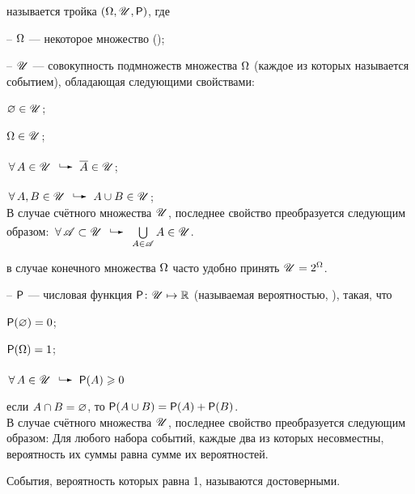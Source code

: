 \documentclass[a4paper,12pt]{article}
\begin{document}
   называется тройка $(\Omega, \mathscr{U}, \mathsf{P})$, где
  \begin{items}{-3}
  \item[--] $\Omega$ --- некоторое множество ();
  \item[--] $\mathscr{U}$ --- совокупность подмножеств множества $\Omega$ (каждое из которых называется  событием), обладающая следующими свойствами:
      \begin{items}{-4}
        \item[\textbullet] $\varnothing\in\mathscr{U}$;
        \item[\textbullet] $\Omega\in\mathscr{U}$;
        \item[\textbullet] $\fa A\in\Us\exec\overline{A}\in\Us$;
        \item[\textbullet] $\fa A,B\in\Us\exec A\cup B\in\Us$;\\%
        В случае счётного множества $\mathscr{U}$, последнее свойство преобразуется следующим образом: $\fa\As\subset\Us\exec\bigcup\limits_{A\in\As}A\in\Us$.
      \end{items}
      \vspace{-0.35cm}
      в случае конечного множества $\Omega$ часто удобно принять $\mathscr{U}=2^\Omega$.
  \item[--] $\mathsf{P}$ --- числовая функция $\mathsf{P}\colon\mathscr{U}\mapsto\mathbb{R}$ (называемая  вероятностью, ), такая, что
      \begin{items}{-4}
        \item[\textbullet] $\mathsf{P}(\varnothing)=0$;
        \item[\textbullet] $\mathsf{P}(\Omega)=1$;
        \item[\textbullet] $\fa A\in\Us\exec\Pf(A)\ge0$
        \item[\textbullet]  если $A\cap B=\varnothing$, то $\mathsf{P}(A\cup B)=\mathsf{P}(A)+\mathsf{P}(B)$.\\
        В случае счётного множества $\mathscr{U}$, последнее свойство преобразуется следующим образом: Для любого набора событий, каждые два из которых несовместны, вероятность их суммы равна сумме их вероятностей.
      \end{items}
      \vspace{-0.35cm}
      События, вероятность которых равна 1, называются  достоверными.
  \end{items}

\vspace{-0.6cm}
\end{document}
